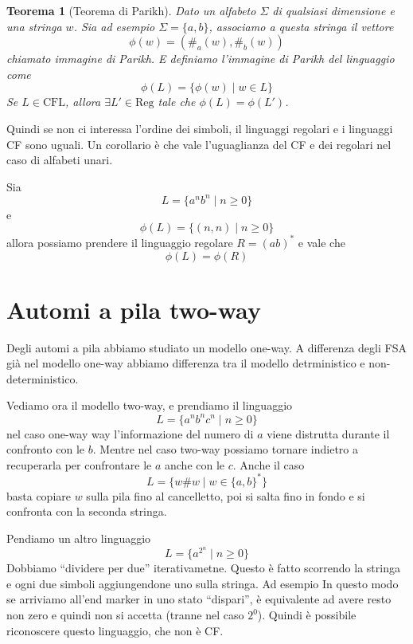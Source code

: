 \documentclass[12pt]{report}
\newtheorem{teorema}{Teorema}
\theoremstyle{definition}
\begin{document}
\begin{teorema}[Teorema di Parikh]
	Dato un alfabeto $\Sigma$ di qualsiasi dimensione e una stringa $w$.
	Sia ad esempio $\Sigma = \{a, b\}$, associamo a questa stringa il vettore 
	$$ \phi(w) = ( \#_a(w), \#_b(w) ) $$
	chiamato immagine di Parikh.
	E definiamo l'immagine di Parikh del linguaggio come
	$$ \phi(L) = \{ \phi(w) \mid w \in L \} $$
	Se $L \in \text{CFL}$, allora $\exists L' \in \text{Reg}$ tale che $\phi(L) = \phi(L')$.
\end{teorema}
Quindi se non ci interessa l'ordine dei simboli, il linguaggi regolari e i linguaggi CF sono uguali.
Un corollario è che vale l'uguaglianza del CF e dei regolari nel caso di alfabeti unari.

\begin{tcolorbox}[breakable]
	Sia 
	$$ L = \{ a^n b^n \mid n \geq 0 \} $$
	e 
	$$ \phi(L) = \{ (n, n) \mid n \geq 0 \} $$
	allora possiamo prendere il linguaggio regolare $R = (ab)^*$ e vale che
	$$ \phi(L) = \phi(R) $$
\end{tcolorbox}

\section{Automi a pila two-way}\label{sec:Automi a pila two-way}
Degli automi a pila abbiamo studiato un modello one-way.
A differenza degli FSA già nel modello one-way abbiamo differenza tra il modello detrministico e non-deterministico.

Vediamo ora il modello two-way, e prendiamo il linguaggio
$$ L = \{ a^n b^n c^n \mid n \geq 0 \} $$
nel caso one-way way l'informazione del numero di $a$ viene distrutta durante il confronto con le $b$.
Mentre nel caso two-way possiamo tornare indietro a recuperarla per confrontare le $a$ anche con le $c$.
Anche il caso 
$$ L = \{ w \# w \mid w \in \{a, b\}^* \} $$
basta copiare $w$ sulla pila fino al cancelletto, poi si salta fino in fondo e si confronta con la seconda stringa.

Pendiamo un altro linguaggio
$$ L = \{ a^{2^n} \mid n \geq 0 \} $$
Dobbiamo ``dividere per due'' iterativametne.
Questo è fatto scorrendo la stringa e ogni due simboli aggiungendone uno sulla stringa.
Ad esempio
In questo modo se arriviamo all'end marker in uno stato ``dispari'', è equivalente ad avere resto non zero e quindi non si accetta (tranne nel caso $2^0$).
Quindi è possibile riconoscere questo linguaggio, che non è CF.
\end{document}
